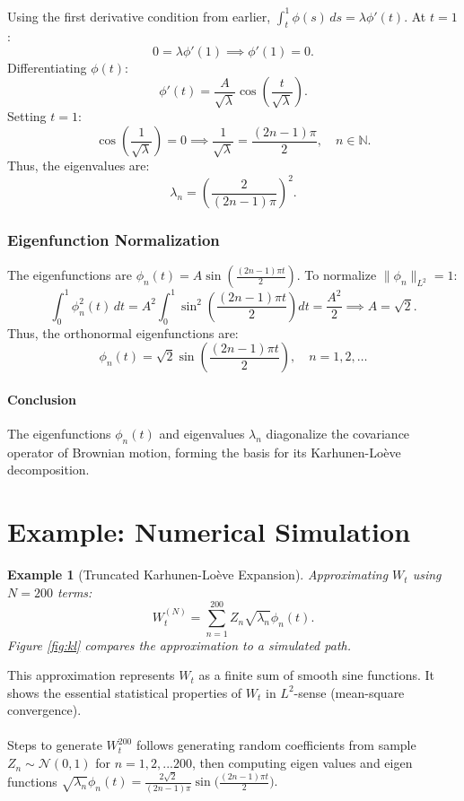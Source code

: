 \documentclass[12pt]{report}
\newtheorem{example}[theorem]{Example}
\begin{document}
Using the first derivative condition from earlier, \(\int_t^1 \phi(s) \, ds = \lambda \phi'(t)\). At \(t = 1\):  
\[
0 = \lambda \phi'(1) \implies \phi'(1) = 0.
\]
Differentiating \(\phi(t)\):  
\[
\phi'(t) = \frac{A}{\sqrt{\lambda}} \cos\left(\frac{t}{\sqrt{\lambda}}\right).
\]
Setting \(t = 1\):  
\[
\cos\left(\frac{1}{\sqrt{\lambda}}\right) = 0 \implies \frac{1}{\sqrt{\lambda}} = \frac{(2n - 1)\pi}{2}, \quad n \in \mathbb{N}.
\]
Thus, the eigenvalues are:  
\[
\lambda_n = \left(\frac{2}{(2n - 1)\pi}\right)^2.
\]

\subsubsection{Eigenfunction Normalization}  
The eigenfunctions are \(\phi_n(t) = A \sin\left(\frac{(2n - 1)\pi t}{2}\right)\). To normalize \(\|\phi_n\|_{L^2} = 1\):  
\[
\int_0^1 \phi_n^2(t) \, dt = A^2 \int_0^1 \sin^2\left(\frac{(2n - 1)\pi t}{2}\right) dt = \frac{A^2}{2} \implies A = \sqrt{2}.
\]
Thus, the orthonormal eigenfunctions are:  
\[
\phi_n(t) = \sqrt{2} \sin\left(\frac{(2n - 1)\pi t}{2}\right), \quad n = 1, 2, \dots
\]

\paragraph*{Conclusion}  
The eigenfunctions \(\phi_n(t)\) and eigenvalues \(\lambda_n\) diagonalize the covariance operator of Brownian motion, forming the basis for its Karhunen-Loève decomposition.  

\section{Example: Numerical Simulation}
\begin{example}[Truncated Karhunen-Loève Expansion]
Approximating \(W_t\) using \(N=200\) terms:
\[
W_t^{(N)} = \sum_{n=1}^{200} Z_n \sqrt{\lambda_n} \phi_n(t).
\]
Figure \ref{fig:kl} compares the approximation to a simulated path.
\end{example}
This approximation represents $W_t$ as a finite sum of smooth sine functions. It shows the essential statistical properties of $W_t$ in $L^2$-sense (mean-square convergence).\\
\\
Steps to generate $W_t^{200}$ follows generating random coefficients from sample $Z_n\sim\mathcal{N}(0,1)$ for $n=1,2,... 200$, then computing eigen values and eigen functions $\sqrt{\lambda_n}\phi_n(t) = \frac{2\sqrt{2}}{(2n-1)\pi}\sin\bigg(\frac{(2n-1)\pi t}{2}\bigg).$
\end{document}
